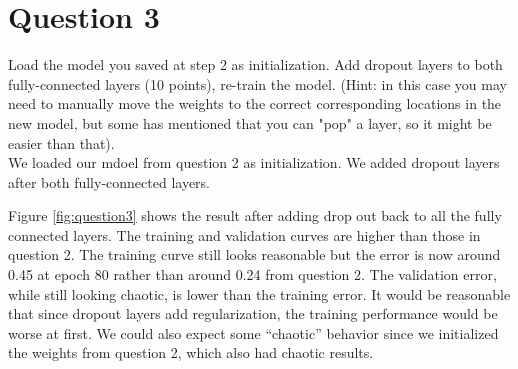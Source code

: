 \documentclass[paper=a4, fontsize=11pt]{scrartcl}
\begin{document}
\section{Question 3}

{\small Load the model you saved at step 2 as initialization. Add dropout layers to both fully-connected layers (10 points), re-train the model. (Hint: in this case you may need to manually move the weights to the correct corresponding locations in the new model, but some has mentioned that you can "pop" a layer, so it might be easier than that).}\\

We loaded our mdoel from question 2 as initialization.  We added dropout layers after both fully-connected layers.

Figure \ref{fig:question3} shows the result after adding drop out back to all the fully connected layers.  The training and validation curves are higher than those in question 2.  The training curve still looks reasonable but the error is now around 0.45 at epoch 80 rather than around 0.24 from question 2.  The validation error, while still looking chaotic, is lower than the training error.  It would be reasonable that since dropout layers add regularization, the training performance would be worse at first.  We could also expect some ``chaotic'' behavior since we initialized the weights from question 2, which also had chaotic results.
\end{document}
